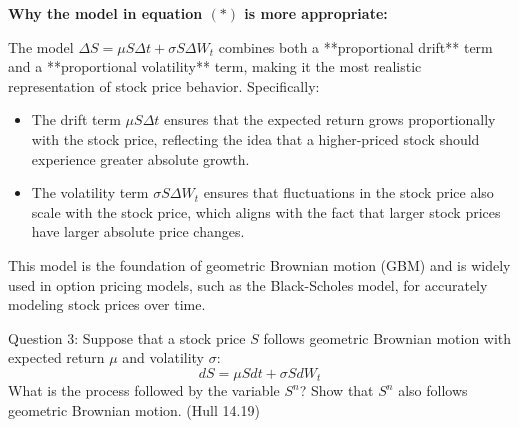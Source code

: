 \documentclass[12pt,letterpaper,onecolumn]{exam}
\begin{document}
\begin{solution}
\textbf{Why the model in equation \( (\ast) \) is more appropriate:}

The model \( \Delta S = \mu S \Delta t + \sigma S \Delta W_t \) combines both a **proportional drift** term and a **proportional volatility** term, making it the most realistic representation of stock price behavior. Specifically:
\begin{itemize}
    \item The drift term \( \mu S \Delta t \) ensures that the expected return grows proportionally with the stock price, reflecting the idea that a higher-priced stock should experience greater absolute growth.
    \item The volatility term \( \sigma S \Delta W_t \) ensures that fluctuations in the stock price also scale with the stock price, which aligns with the fact that larger stock prices have larger absolute price changes.
\end{itemize}

This model is the foundation of geometric Brownian motion (GBM) and is widely used in option pricing models, such as the Black-Scholes model, for accurately modeling stock prices over time.

\end{solution}

\newpage

\begin{question}{Question 3:}
Suppose that a stock price \( S \) follows geometric Brownian motion with expected return \( \mu \) and volatility \( \sigma \):
\[
dS = \mu S dt + \sigma S dW_t
\]
What is the process followed by the variable \( S^n \)? Show that \( S^n \) also follows geometric Brownian motion. (Hull 14.19)
\end{question}
\end{document}
